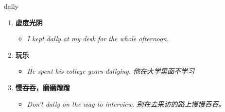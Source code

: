 
\begin{frame}
{\huge dally}
\begin{center}
\begin{enumerate}\Large
  \item \textbf{虚度光阴}
  \begin{itemize}
    \item \em{\Large{I kept dally at my desk for the whole afternoon.}}
  \end{itemize}
  \item \textbf{玩乐}
  \begin{itemize}
    \item \em{\Large{He spent his college years dallying. 他在大学里面不学习}}
  \end{itemize}
  \item \textbf{慢吞吞，磨磨蹭蹭}
  \begin{itemize}
    \item \em{\Large{Don't dally on the way to interview. 别在去采访的路上慢慢吞吞。}}
  \end{itemize}
\end{enumerate}
\end{center}
\end{frame}
